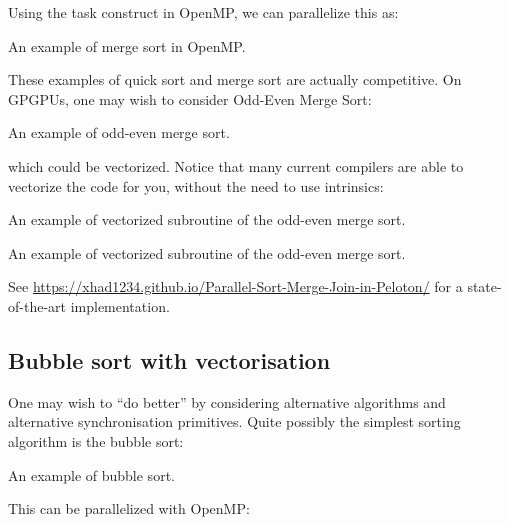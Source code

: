 Using the task construct in OpenMP, we can parallelize this as:

    \begin{codebox}[breakable]{}
        \footnotesize An example of merge sort in OpenMP.
        \tcblower
        \end{codebox}

These examples of quick sort and merge sort are actually competitive. 
 On GPGPUs, one may wish to consider Odd-Even Merge Sort:

 \begin{codebox}[breakable]{}
    \footnotesize An example of odd-even merge sort.
    \tcblower
    \end{codebox}

which could be vectorized. Notice that many current compilers are able to vectorize 
the code for you, without the need to use intrinsics: 

\begin{codebox}[breakable]{}
    \footnotesize An example of vectorized subroutine of the odd-even merge sort.
    \tcblower
    \end{codebox}

    \begin{codebox}[breakable]{}
        \footnotesize An example of vectorized subroutine of the odd-even merge sort.
        \tcblower
        \end{codebox}

See \url{https://xhad1234.github.io/Parallel-Sort-Merge-Join-in-Peloton/} for a state-of-the-art implementation. 

\subsection{Bubble sort with vectorisation}

One may wish to ``do better'' by considering alternative algorithms and alternative synchronisation primitives. Quite possibly the simplest sorting algorithm is the bubble sort: 

\begin{codebox}[breakable]{}
\footnotesize An example of bubble sort.
\tcblower
{}
\end{codebox}

This can be parallelized with OpenMP:

